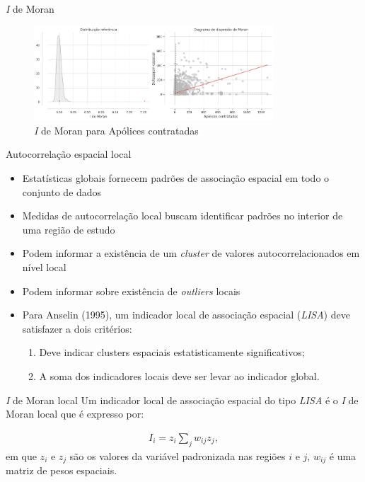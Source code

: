 \documentclass[aspectratio=169]{beamer}
\begin{document}
\begin{frame}{\textit{I} de Moran} %
		\begin{figure}
			\centering
			\includegraphics[width=0.8\textwidth]{img/i_de_moran.png}
			\caption{\textit{I} de Moran para Apólices contratadas}
		\end{figure}
\end{frame}

\begin{frame}{Autocorrelação espacial local}
	\begin{itemize}
		\item Estatísticas globais fornecem padrões de associação espacial em todo o conjunto de dados
		\item Medidas de autocorrelação local buscam identificar padrões no interior de uma região de estudo  
		\item Podem informar a existência de um \textit{cluster} de valores autocorrelacionados em nível local
		\item Podem informar sobre existência de \textit{outliers} locais
		\item Para Anselin (1995), um indicador local de associação espacial (\textit{LISA}) deve satisfazer a dois critérios:
		\vspace{0.25cm}
		\begin{enumerate}
			\item Deve indicar clusters espaciais estatisticamente significativos;
			\item A soma dos indicadores locais deve ser levar ao indicador global.
		\end{enumerate}
	\end{itemize}
\end{frame}

\begin{frame}{\textit{I} de Moran local}
	Um indicador local de associação espacial do tipo \textit{LISA} é o \textit{I} de Moran local que é expresso por: 
	\begin{block}{}
		\small
		\vspace{0.25cm}
		\begin{align*}
		I_i = z_i \sum_{j}^{} w_{ij} z_j,
		\end{align*}
		\noindent \small em que $z_i$ e $z_j$ são os valores da variável padronizada nas regiões $i$ e $j$, $w_{ij}$ é uma matriz de pesos espaciais.
	\end{block}	
\end{frame}
\end{document}

